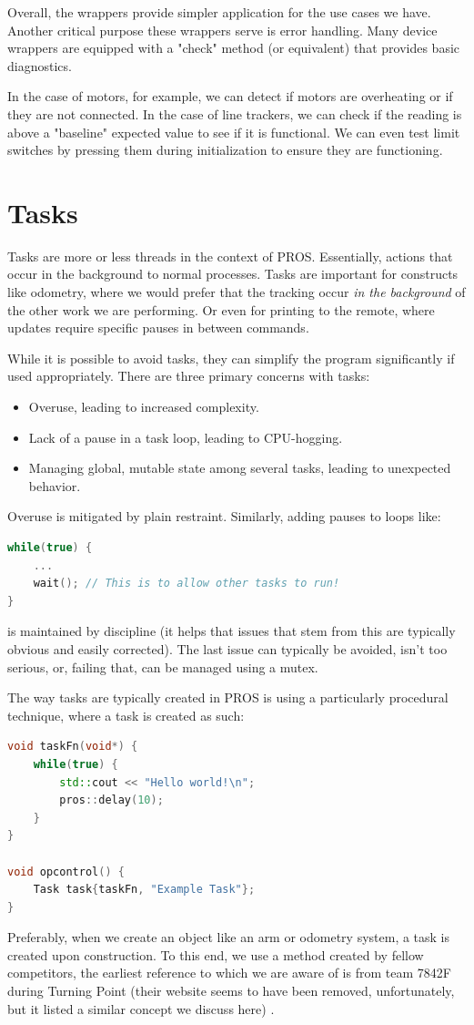 Overall, the wrappers provide simpler application for the use cases we have. Another critical purpose these wrappers serve is error handling. Many device wrappers are equipped with a "check" method (or equivalent) that provides basic diagnostics. 

In the case of motors, for example, we can detect if motors are overheating or if they are not connected. In the case of line trackers, we can check if the reading is above a "baseline" expected value to see if it is functional. We can even test limit switches by pressing them during initialization to ensure they are functioning. 

\section{Tasks}
Tasks are more or less threads in the context of PROS. Essentially, actions that occur in the background to normal processes. Tasks are important for constructs like odometry, where we would prefer that the tracking occur \textit{in the background} of the other work we are performing. Or even for printing to the remote, where updates require specific pauses in between commands. 

While it is possible to avoid tasks, they can simplify the program significantly if used appropriately. There are three primary concerns with tasks:
\begin{itemize}
    \item Overuse, leading to increased complexity.
    \item Lack of a pause in a task loop, leading to CPU-hogging. 
    \item Managing global, mutable state among several tasks, leading to unexpected behavior. 
\end{itemize}
Overuse is mitigated by plain restraint. Similarly, adding pauses to loops like:
\begin{lstlisting}[language=C++]
while(true) {
    ...
    wait(); // This is to allow other tasks to run!
}
\end{lstlisting}
is maintained by discipline (it helps that issues that stem from this are typically obvious and easily corrected). The last issue can typically be avoided, isn't too serious, or, failing that, can be managed using a mutex.  

The way tasks are typically created in PROS is using a particularly procedural technique, where a task is created as such:
\begin{lstlisting}[language=C++]
void taskFn(void*) {
    while(true) {
        std::cout << "Hello world!\n";
        pros::delay(10);
    }
}

void opcontrol() {
    Task task{taskFn, "Example Task"};
}
\end{lstlisting}
Preferably, when we create an object like an arm or odometry system, a task is created upon construction. To this end, we use a method created by fellow competitors, the earliest reference to which we are aware of is from team 7842F during Turning Point (their website seems to have been removed, unfortunately, but it listed a similar concept we discuss here) \cite{bib:theotasks}.


